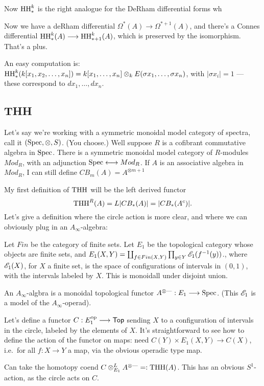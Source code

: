 \documentclass[11pt]{article}
\begin{document}
\begin{GeoffroyTopologicalHochschildHomology}
\begin{enumerate}
\begin{thm*}
Now $\textup{HH}_*^k$ is the right analogue for the DeRham differential forms wh

Now we have a deRham differential $\Omega^*(A)\to\Omega^{*+1}(A)$, and there's a Connes differential $\textup{HH}_*^k(A)\longrightarrow \textup{HH}_{*+1}^k(A)$, which is preserved by the isomorphism. That's a plus.
\end{thm*}
An easy computation is:
$\textup{HH}_*^k(k[x_1,x_2,\ldots,x_n])=k[x_1,\ldots,x_n]\otimes_k E(\sigma x_1,\ldots,\sigma x_n)$, with $|\sigma x_i|=1$ --- these correspond to $d x_1,\ldots, d x_n$.
\end{enumerate}
\subsection*{THH}
Let's say we're working with a symmetric monoidal model category of spectra, call it $(\operatorname{Spec},\otimes,S)$. (You choose.) Well suppose $R$ is a cofibrant commutative algebra in $\operatorname{Spec}$. There is a symmetric monoidal model category of $R$-modules $Mod_R$, with an adjunction $\operatorname{Spec}\longleftrightarrow Mod_R$. 
If $A$ is an associative algebra in $Mod_R$, I can still define $CB_m(A)=A^{\otimes m+1}$

My first definition of $\textup{THH}$ will be the left derived functor
\[\textup{THH}^R(A)=L|CB_*(A)|=|CB_*(A^c)|.\]
Let's give a definition where the circle action is more clear, and where we can obviously plug in an $A_\infty$-algebra:
\begin{defn*} 
Let $Fin$ be the category of finite sets. Let $E_1$ be the topological category whose objects are finite sets, and $E_1(X,Y)=\coprod_{f\in Fin(X,Y)}\prod_{y\in Y} \mathscr{E}_1(f^{-1}(y))$., where $\mathscr{E}_1(X)$, for $X$ a finite set, is the space of configurations of intervals in $(0,1)$, with the intervals labeled by $X$.
 This is monoidall under disjoint union.

An $A_\infty$-algbra is a monoidal topological functor $A^{\otimes\textup{---}}:E_1\longrightarrow\operatorname{Spec}$. (This $\mathscr{E}_1$ is a model of the $A_\infty$-operad).

Let's define a functor $C:E_1^{\textup{op}}\longrightarrow\operatorname{{\mathsf{Top}}}$ sending $X$ to a configuration of intervals in the circle, labeled by the elements of $X$. It's straightforward to see how to define the action of the functor on maps: need $C(Y)\times E_1(X,Y)\to C(X)$, i.e.\ for all $f:X\to Y$ a map, via the obvious operadic type map.
\end{defn*}
Can take the homotopy coend $C\otimes_{E_1}^L A^{\otimes\textup{---}}=:\textup{THH}(A)$. This has an obvious $S^1$-action, as the circle acts on $C$.

\end{GeoffroyTopologicalHochschildHomology}
\end{document}
